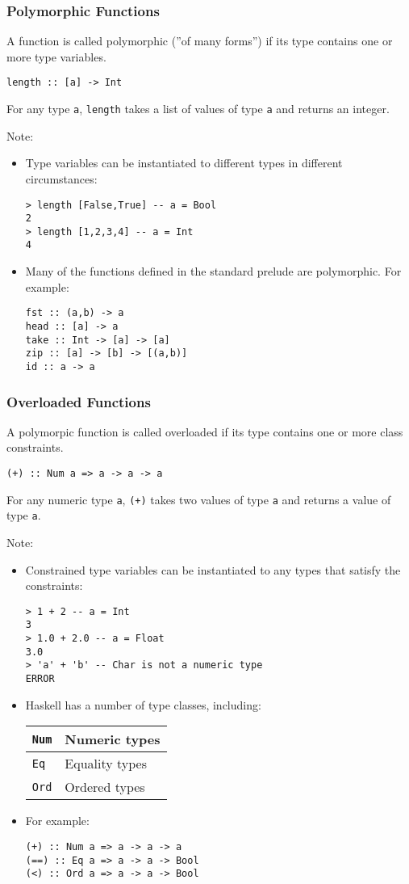 \begin{multicols}{2}
\subsubsection{Polymorphic Functions}
A function is called polymorphic (''of many forms'') if its type contains one or more type variables.
\begin{lstlisting}
length :: [a] -> Int
\end{lstlisting}
For any type \lstinline{a}, \lstinline{length} takes a list of values of type \lstinline{a} and returns an integer.

Note:
\begin{itemize}
  \item Type variables can be instantiated to different types in different circumstances:
\begin{lstlisting}
> length [False,True] -- a = Bool
2
> length [1,2,3,4] -- a = Int
4
\end{lstlisting}
  \item Many of the functions defined in the standard prelude are polymorphic. For example:
\begin{lstlisting}
fst :: (a,b) -> a
head :: [a] -> a
take :: Int -> [a] -> [a]
zip :: [a] -> [b] -> [(a,b)]
id :: a -> a
\end{lstlisting}
\end{itemize}

\subsubsection{Overloaded Functions}
A polymorpic function is called overloaded if its type contains one or more class constraints.
\begin{lstlisting}
(+) :: Num a => a -> a -> a
\end{lstlisting}
For any numeric type \lstinline{a}, \lstinline{(+)} takes two values of type \lstinline{a} and returns a value of type \lstinline{a}.

Note:
\begin{itemize}
  \item Constrained type variables can be instantiated to any types that satisfy the constraints:
\begin{lstlisting}
> 1 + 2 -- a = Int
3
> 1.0 + 2.0 -- a = Float
3.0
> 'a' + 'b' -- Char is not a numeric type
ERROR
\end{lstlisting}
  \item Haskell has a number of type classes, including:
\begin{tabularx}{\linewidth}{|X|X|}
  \hline
  \lstinline|Num| & Numeric types \\
  \hline
  \lstinline|Eq| & Equality types \\
  \hline
  \lstinline|Ord| & Ordered types \\
  \hline
\end{tabularx}
  \item For example:
\begin{lstlisting}
(+) :: Num a => a -> a -> a
(==) :: Eq a => a -> a -> Bool
(<) :: Ord a => a -> a -> Bool
\end{lstlisting}
\end{itemize}


\end{multicols}
